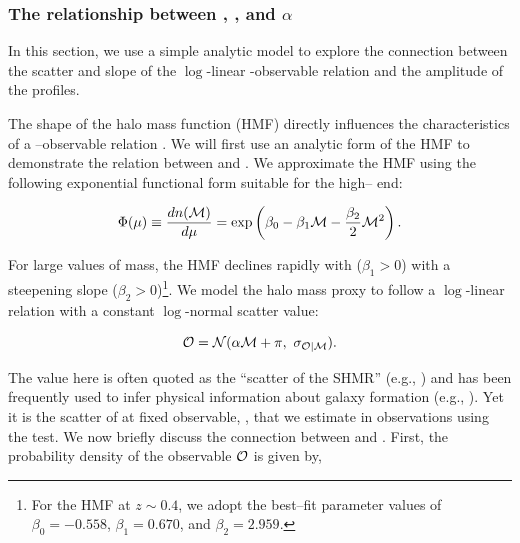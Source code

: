 \documentclass[fleqn,usenatbib,useAMS]{mnras}
\begin{document}
\subsubsection{The relationship between \scatterMhaloObsSym{}, \scatterObsSymMhalo{}, and $\alpha$}
    \label{sec:comp_scatters}

    In this section, we use a simple analytic model to explore the connection between the scatter
    and slope of the $\log$-linear \mvir{}-observable relation and the amplitude of the \dsigma{}
    profiles.
    
    The shape of the halo mass function (HMF) directly influences the characteristics of a
    \mvir{}--observable relation \citep[\eg{}][]{Tinker2008}.
    We will first use an analytic form of the HMF to demonstrate the relation between 
    \scatterMhaloObsSym{} and \scatterObsSymMhalo{}.
    We approximate the HMF using the following exponential functional form suitable for the 
    high--\mvir{} end:

    \begin{equation}
        \Phi(\mu){} \equiv \frac{dn({\mathcal{M}}{})}{d\mu{}}  = \exp \left(\beta_0 - \beta_1 {\mathcal{M}}{} - \frac{\beta_2}{2}
        {\mathcal{M}}{}^2 \right).
        \label{eq:quadratic_hmf}
    \end{equation}

    \noindent For large values of mass, the HMF declines rapidly with \mhalo{} ($\beta_1 > 0$) with
    a steepening slope ($\beta_2 > 0$)\footnote{For the  HMF at $z\sim 0.4$, we adopt the 
    best--fit parameter values of $\beta_{0}=-0.558$, $\beta_{1}=0.670$, and $\beta_{2}=2.959$.}. 
    We model the halo mass proxy \obsSym to follow a $\log$-linear relation with a constant
    $\log$-normal scatter value:

    \begin{equation}
        {\mathcal{O}} = \mathcal{N}(\alpha {\mathcal{M}} + \pi,\ \sigma_{\mathcal{O} | \mathcal{M}}).
        \label{eq:lognormal_obs_given_mhalo}
    \end{equation}

    The \scatterObsSymMhalo{} value here is often quoted as the ``scatter of the SHMR'' (e.g.,
    \citealt{More2011, Leauthaud2012, Reddick2013, Behroozi2013})
    and has been frequently used to infer physical information about galaxy formation (e.g.,
    \citealt{Gu2016, Matthee2017, Tinker2017c, Wechsler2018}).
    Yet it is the scatter of \mvir{} at fixed observable, \scatterMhaloObsSym{}, that we estimate in
    observations using the \topn{} test.
    We now briefly discuss the connection between \scatterObsSymMhalo{} and \scatterMhaloObsSym{}.
    First, the probability density of the observable ${\mathcal{O}}$ is given by,
\end{document}

